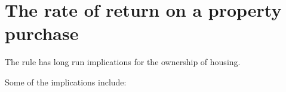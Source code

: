 


\section{The rate of return on a property purchase}

 
The rule has long run implications for the ownership of housing. 

Some of the implications include:


